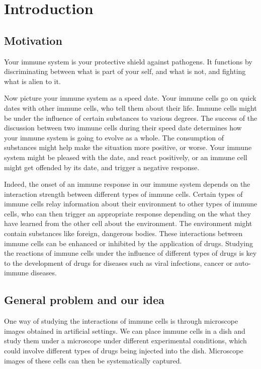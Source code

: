 \chapter{Introduction}

\section{Motivation}

Your immune system is your protective shield against pathogens. It functions by discriminating between what is part of your self, and what is not, and fighting what is alien to it.

Now picture your immune system as a speed date. Your immune cells go on quick dates with other immune cells, who tell them about their life. Immune cells might be under the influence of certain substances to various degrees. The success of the discussion between two immune cells during their speed date determines how your immune system is going to evolve as a whole. The consumption of substances might help make the situation more positive, or worse. Your immune system might be pleased with the date, and react positively, or an immune cell might get offended by its date, and trigger a negative response. %

Indeed, the onset of an immune response in our immune system depends on the interaction strength between different types of immune cells. Certain types of immune cells relay information about their environment to other types of immune cells, who can then trigger an appropriate response depending on the what they have learned from the other cell about the environment. The environment might contain substances like foreign, dangerous bodies. These interactions between immune cells can be enhanced or inhibited by the application of drugs. Studying the reactions of immune cells under the influence of different types of drugs is key to the development of drugs for diseases such as viral infections, cancer or auto-immune diseases.

\section{General problem and our idea}

One way of studying the interactions of immune cells is through microscope images obtained in artificial settings. We can place immune cells in a dish and study them under a microscope under different experimental conditions, which could involve different types of drugs being injected into the dish. Microscope images of these cells can then be systematically captured.

